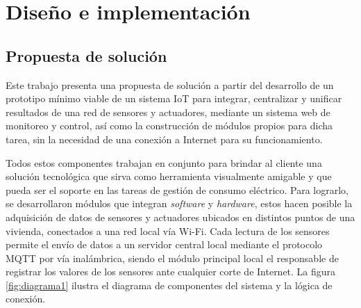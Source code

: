 \chapter{Diseño e implementación} %

\label{Chapter3} %






\section{Propuesta de solución}

Este trabajo presenta una propuesta de solución a partir del desarrollo de un prototipo mínimo viable de un sistema IoT para integrar, centralizar y unificar resultados de una red de sensores y actuadores, mediante un sistema web de monitoreo y control, así como la construcción de módulos propios para dicha tarea, sin la necesidad de una conexión a Internet para su funcionamiento. 

Todos estos componentes trabajan en conjunto para brindar al cliente una solución tecnológica que sirva como herramienta visualmente amigable y que pueda ser el soporte en las tareas de gestión de consumo eléctrico. Para lograrlo, se desarrollaron módulos que integran \emph{software} y \emph{hardware}, estos hacen posible la adquisición de datos de sensores y actuadores ubicados en distintos puntos de una vivienda, conectados a una red local vía Wi-Fi. Cada lectura de los sensores permite el envío de datos a un servidor central local mediante el protocolo MQTT por vía inalámbrica, siendo el módulo principal local el responsable de registrar los valores de los sensores ante cualquier corte de Internet. La figura \ref{fig:diagrama1} ilustra el diagrama de componentes del sistema y la lógica de conexión.

